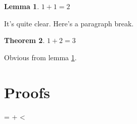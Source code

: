 \documentclass[a4paper]{article}
\makeatletter
\newcounter{proofcount}
\def\printproofs{%
			\count@=\z@
			\loop
				\the\toks\numexpr\prooftoks+\count@\relax
				\ifnum\count@<\value{proofcount}%
				\advance\count@\@ne
			\repeat%
		}
\newtheorem{thm}{Theorem}
\newtheorem{lem}[thm]{Lemma}
\makeatother
\begin{document}
\begin{lem}\label{addition}
	$1+1=2$
\end{lem}
\begin{proofatend}
	It's quite clear.
	\newpage
	Here's a paragraph break.
\end{proofatend}

\newpage

\begin{thm}
	$1+2=3$
\end{thm}
\begin{proofatend}
	Obvious from lemma \ref{addition}.
\end{proofatend}

\newpage

\section*{Proofs}

\printproofs
\end{document}
